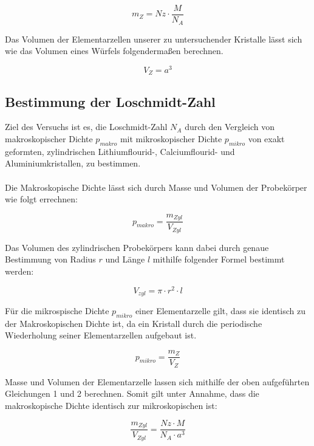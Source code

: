 \documentclass[12pt,a4paper,titlepage,headinclude,bibtotoc]{scrartcl}
\begin{document}
\begin{equation}
m_{Z}=Nz \cdot \dfrac{M}{N_{A}}
\end{equation} 

Das Volumen der Elementarzellen unserer zu untersuchender Kristalle lässt sich wie das Volumen eines Würfels folgendermaßen berechnen.

\begin{equation}
V_Z = a^3
\end{equation}


\subsection{Bestimmung der Loschmidt-Zahl}
 
Ziel des Versuchs ist es, die Loschmidt-Zahl $N_{A}$ durch den Vergleich von makroskopischer Dichte $p_{makro}$ mit mikroskopischer Dichte $p_{mikro}$ von exakt geformten, zylindrischen Lithiumflourid-, Calciumflourid- und Aluminiumkristallen, zu bestimmen.\\\\

Die Makroskopische Dichte lässt sich durch  Masse und Volumen der Probekörper wie folgt errechnen:

\begin{equation}
p_{makro}= \frac{m_{Zyl}}{V_{Zyl}}
\end{equation}

Das Volumen des zylindrischen Probekörpers kann dabei durch genaue Bestimmung von Radius $r$ und Länge $l$ mithilfe folgender Formel bestimmt werden:

\begin{equation}
V_{zyl} = \pi \cdot r^{2} \cdot l
\end{equation}

Für die mikrospische Dichte $p_{mikro}$ einer Elementarzelle gilt, dass sie identisch zu der Makroskopischen Dichte ist, da ein Kristall durch die periodische Wiederholung seiner Elementarzellen aufgebaut ist.

\begin{equation}
p_{mikro}=\frac{m_Z}{V_Z}
\end{equation}

Masse und Volumen der Elementarzelle lassen sich mithilfe der oben aufgeführten Gleichungen 1 und 2 berechnen. Somit gilt unter Annahme, dass die makroskopische Dichte identisch zur mikroskopischen ist:

\begin{equation}
\frac{m_{Zyl}}{V_{Zyl}}= \frac{Nz \cdot M}{N_{A} \cdot a^3}
\end{equation}
\end{document}
